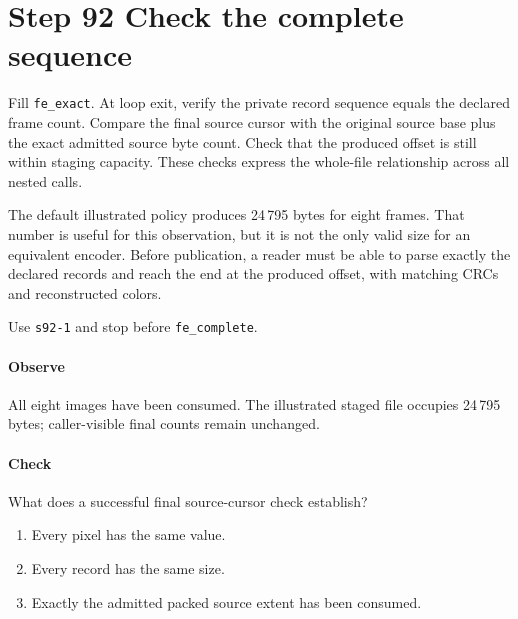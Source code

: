 \section{Step 92 Check the complete sequence}
Fill \texttt{fe\_exact}. At loop exit, verify the private record sequence equals the declared frame count. Compare the final source cursor with the original source base plus the exact admitted source byte count. Check that the produced offset is still within staging capacity. These checks express the whole-file relationship across all nested calls.

The default illustrated policy produces 24\,795 bytes for eight frames. That number is useful for this observation, but it is not the only valid size for an equivalent encoder. Before publication, a reader must be able to parse exactly the declared records and reach the end at the produced offset, with matching CRCs and reconstructed colors.

Use \texttt{s92-1} and stop before \texttt{fe\_complete}.

\paragraph{Observe} All eight images have been consumed. The illustrated staged file occupies 24\,795 bytes; caller-visible final counts remain unchanged.

\paragraph{Check} What does a successful final source-cursor check establish?
\begin{enumerate}[label=\Alph*.]
  \item Every pixel has the same value.
  \item Every record has the same size.
  \item Exactly the admitted packed source extent has been consumed.
\end{enumerate}
